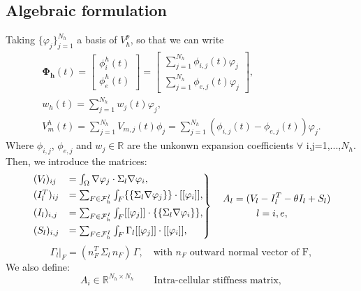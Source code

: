 \documentclass[a4paper,11pt]{article}
\begin{document}
    \subsection{Algebraic formulation}
    Taking $\{\varphi_j\}_{j=1}^{N_h}$ a basis of $V_h^p$, so that we can write
    \begin{equation*}
    \begin{gathered}
    \bm{\Phi_h}(t) = \begin{bmatrix} \phi_i^h(t) \\ \phi_e^h(t) \end{bmatrix} = \begin {bmatrix}\sum_{j=1}^{N_h} \phi_{i,j}(t)\varphi_j \\ \sum_{j=1}^{N_h} \phi_{e,j}(t)\varphi_j \end{bmatrix},\\
    w_h(t) = \sum_{j=1}^{N_h}w_j(t)\varphi_j,\\
    V_m^h(t)=\sum_{j=1}^{N_h} V_{m,j}(t) \phi_j=\sum_{j=1}^{N_h}(\phi_{i,j}(t)-\phi_{e,j}(t))\varphi_j.
 \end{gathered}
 \end{equation*}
 Where $\phi_{i,j}$, $\phi_{e,j}$ and $w_j \in \mathbb{R}$ are the unkonwn expansion coefficients $\forall$ i,j=1,...,$N_h$.
 Then, we introduce the matrices:
 \begin{equation*}
\begin{rcases}
(V_l)_{ij} &= \int_{\Omega}\nabla\varphi_j \cdot \Sigma_l \nabla \varphi_i,
\\ (I_l^T)_{ij} &= \sum_{F \in \mathcal{F}_h^I} \int_{F} \{\{\Sigma_l \nabla\varphi_j\}\} \cdot [[\varphi_i]],
\\ (I_l)_{i,j} &= \sum_{F \in \mathcal{F}_h^I} \int_{F} [[\varphi_j]] \cdot \{\{\Sigma_l \nabla \varphi_i\}\},
\\(S_l)_{i,j} &= \sum_{F \in \mathcal{F}_h^I} \int_{F} \Gamma_l[[\varphi_j]] \cdot [[\varphi_i]],
\end{rcases}
\begin{gathered}
\quad A_l = (V_l -I_l^T - \theta I_l + S_l)\\
l=i,e, \\
\end{gathered}
\end{equation*}
\begin{equation*}
\Gamma_l\vert_F = (n_F^T \, \Sigma_l \, n_F) \,\Gamma, \quad \text{with } n_F \text{ outward normal vector of F},
\end{equation*}
We also define:
\begin{equation*}
A_i \in \mathbb{R}^{N_h \times N_h} \qquad{\text{Intra-cellular stiffness matrix}},
\end{equation*}
\end{document}
